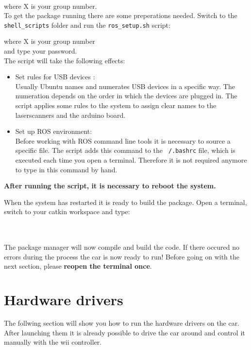 \\
where X is your group number. \\

To get the package running there are some preperations needed. Switch to the \texttt{shell\_scripts} folder and run the \texttt{ros\_setup.sh} script:

 where X is your group number \\
 and type your password. \\

The script will take the following effects:

\begin{itemize}
\item Set rules for USB devices :\\
Usually Ubuntu names and numerates USB devices in a specific way. The numeration depends on the order in which the devices are plugged in. The script applies some rules to the system to assign clear names to the laserscanners and the arduino board.
\item Set up ROS environment:\\
Before working with ROS command line tools it is necessary to source a specific file. The script adds this command to the \texttt{~/.bashrc} file, which is executed each time you open a terminal. Therefore it is not required anymore to type in this command by hand. 
\end{itemize}

\textbf{After running the script, it is necessary to reboot the system.}

When the system has restarted it is ready to build the package. Open a terminal, switch to your catkin workspace and type:

\\
\\

The package manager will now compile and build the code. If there occured no errors during the process the car is now ready to run! Before going on with the next section, please \textbf{reopen the terminal once}.

\newpage
\section{Hardware drivers}
\label{sec:tas_package_drivers}
The follwing section will show you how to run the hardware drivers on the car. After launching them it is already possible to drive the car around and control it manually with the wii controller.

